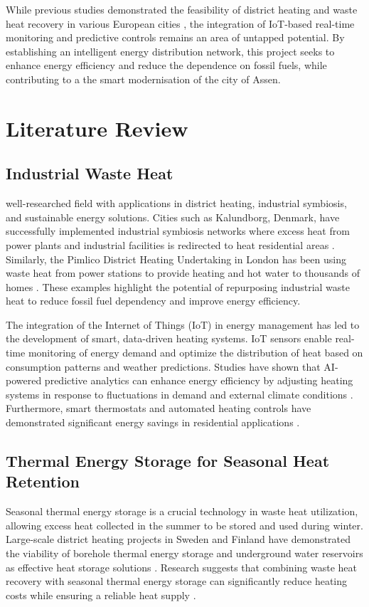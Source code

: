 \documentclass{article}
\begin{document}
While previous studies demonstrated the feasibility of district heating and waste heat recovery in various European cities \cite{kalundborg}, the integration of IoT-based real-time monitoring and predictive controls remains an area of untapped potential. By establishing an intelligent energy distribution network, this project seeks to enhance energy efficiency and reduce the dependence on fossil fuels, while contributing to a the smart modernisation of the city of Assen.

\section{Literature Review}

\subsection{Industrial Waste Heat}

well-researched field with applications in district heating, industrial symbiosis, and sustainable energy solutions. Cities such as Kalundborg, Denmark, have successfully implemented industrial symbiosis networks where excess heat from power plants and industrial facilities is redirected to heat residential areas \cite{kalundborg}. 
Similarly, the Pimlico District Heating Undertaking in London has been using waste heat from power stations to provide heating and hot water to thousands of homes \cite{pimlico}. These examples highlight the potential of repurposing industrial waste heat to reduce fossil fuel dependency and improve energy efficiency.


The integration of the Internet of Things (IoT) in energy management has led to the development of smart, data-driven heating systems. IoT sensors enable real-time monitoring of energy demand and optimize the distribution of heat based on consumption patterns and weather predictions. Studies have shown that AI-powered predictive analytics can enhance energy efficiency by adjusting heating systems in response to fluctuations in demand and external climate conditions \cite{ai_energy}. Furthermore, smart thermostats and automated heating controls have demonstrated significant energy savings in residential applications \cite{smart_heating}.

\subsection{Thermal Energy Storage for Seasonal Heat Retention}
Seasonal thermal energy storage is a crucial technology in waste heat utilization, allowing excess heat collected in the summer to be stored and used during winter. Large-scale district heating projects in Sweden and Finland have demonstrated the viability of borehole thermal energy storage and underground water reservoirs as effective heat storage solutions \cite{stockholm_heat}. Research suggests that combining waste heat recovery with seasonal thermal energy storage can significantly reduce heating costs while ensuring a reliable heat supply \cite{tes_review}.
\end{document}
